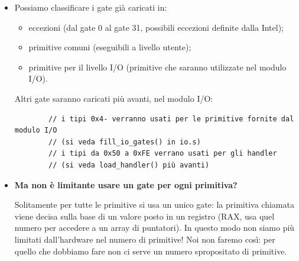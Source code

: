 \begin{itemize}
\begin{multicols}{2}
\begin{verbatim}
			// tipo del driver del timer (priorità  massima)
			#define TIPO_TIMER		0xFF
		\end{verbatim}
	\end{multicols}
	\normalsize
	\item Possiamo classificare i gate già caricati in:
	\begin{itemize}
		\item eccezioni (dal gate 0 al gate 31, possibili eccezioni definite dalla Intel);
		\item primitive comuni (eseguibili a livello utente);
		\item primitive per il livello I/O (primitive che saranno utilizzate nel modulo I/O).
	\end{itemize}
	Altri gate saranno caricati più avanti, nel modulo I/O:
	\small 
	\begin{verbatim}
		// i tipi 0x4- verranno usati per le primitive fornite dal modulo I/O
		// (si veda fill_io_gates() in io.s)
		// i tipi da 0x50 a 0xFE verrano usati per gli handler
		// (si veda load_handler() più avanti)
	\end{verbatim}
	\normalsize 
	\item \textbf{Ma non è limitante usare un gate per ogni primitiva?} 
	
	Solitamente per tutte le primitive si usa un unico gate: la primitiva chiamata viene decisa sulla base di un valore posto in un registro (RAX, usa quel numero per accedere a un array di puntatori). In questo modo non siamo più limitati dall'hardware nel numero di primitive! Noi non faremo così: per quello che dobbiamo fare non ci serve un numero spropositato di primitive.
\end{itemize}


